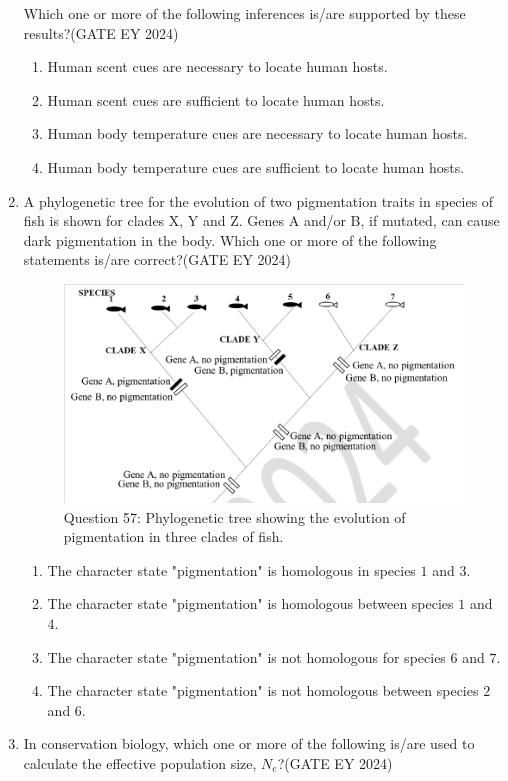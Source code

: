 \begin{enumerate}

Which one or more of the following inferences is/are supported by these results?\hfill{(GATE EY 2024)}
    \begin{enumerate}
        \item Human scent cues are necessary to locate human hosts.
        \item Human scent cues are sufficient to locate human hosts.
        \item Human body temperature cues are necessary to locate human hosts.
        \item Human body temperature cues are sufficient to locate human hosts.
    \end{enumerate}
\item A phylogenetic tree for the evolution of two pigmentation traits in species of fish is shown for clades X, Y and Z. Genes A and/or B, if mutated, can cause dark pigmentation in the body. Which one or more of the following statements is/are correct?\hfill{(GATE EY 2024)}
\begin{figure}[!ht]
    \centering
    \includegraphics[width=0.8\columnwidth]{figs/Q-57.png}
    \caption{Question 57: Phylogenetic tree showing the evolution of pigmentation in three clades of fish.}
    \label{Q.57}
\end{figure}
    \begin{enumerate}
        \item The character state "pigmentation" is homologous in species $1$ and $3$.
        \item The character state "pigmentation" is homologous between species $1$ and $4$.
        \item The character state "pigmentation" is not homologous for species $6$ and $7$.
        \item The character state "pigmentation" is not homologous between species $2$ and $6$.
    \end{enumerate}
\item In conservation biology, which one or more of the following is/are used to calculate the effective population size, $N_e$?\hfill{(GATE EY 2024)}

\end{enumerate}

